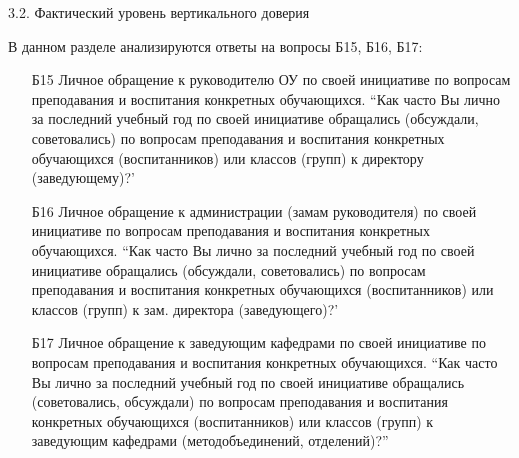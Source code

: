 \begin{frame}{3.2. Фактический уровень вертикального доверия}

\tiny

В данном разделе анализируются ответы на вопросы Б15, Б16, Б17:
\bigskip

\begin{itemize}

\item [Б15] Личное обращение к руководителю ОУ по своей инициативе по вопросам преподавания и воспитания конкретных обучающихся. ``Как часто Вы лично за последний учебный год по своей инициативе обращались (обсуждали, советовались) по вопросам преподавания и воспитания конкретных обучающихся (воспитанников) или классов (групп) к директору (заведующему)?'

\item [Б16] Личное обращение к администрации (замам руководителя) по своей инициативе по вопросам преподавания и воспитания конкретных обучающихся. ``Как часто Вы лично за последний учебный год по своей инициативе обращались (обсуждали, советовались) по вопросам преподавания и воспитания конкретных обучающихся (воспитанников) или классов (групп) к зам. директора (заведующего)?'

\item [Б17] Личное обращение к заведующим кафедрами  по своей инициативе по вопросам преподавания и воспитания конкретных обучающихся. ``Как часто Вы лично за последний учебный год по своей инициативе обращались (советовались, обсуждали) по вопросам преподавания и воспитания конкретных обучающихся (воспитанников) или классов (групп)  к заведующим кафедрами  (методобъединений, отделений)?''

\end{itemize}

\end{frame}


